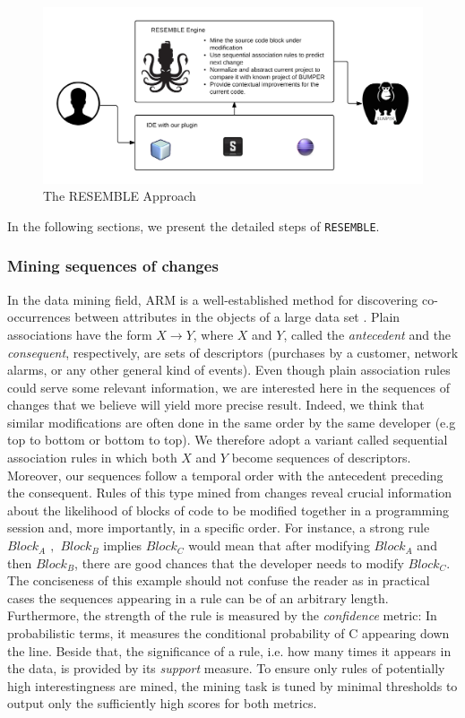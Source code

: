 \begin{figure}[h!]
    \includegraphics[scale=0.9]{media/resemble-approach.png}
    \caption{The RESEMBLE Approach
    \label{fig:RESEMBLE-approach}}
\end{figure}

In the following sections, we present the detailed steps of {\tt RESEMBLE}.

\subsubsection{Mining sequences of changes}

In the data mining field, ARM is a
well-established method for discovering co-occurrences between attributes
in the objects of a large data set \cite{Gregory1991,HEIKKI1997}. Plain
associations have the form $X \rightarrow Y$, where $X$ and $Y$,
called the \textit{antecedent} and the \textit{consequent}, respectively, are sets of descriptors
(purchases by a customer, network alarms, or any other general kind of events).
Even though plain association rules could serve some relevant information, we are interested here in
the sequences of changes that we believe will yield more precise result. Indeed, we think that similar modifications are often done in the same order by the same developer (e.g top to bottom or bottom to top).
We therefore adopt a variant called sequential association rules in which
both $X$ and $Y$ become sequences of descriptors.
Moreover, our sequences follow a temporal order with the antecedent preceding the consequent. 
Rules of this type mined from changes reveal crucial
information about the likelihood of blocks of code to be modified  together in a programming session
and, more importantly, in a specific order. 
For instance, a strong rule \emph{$Block_A$ $,$ $Block_B$} implies \emph{$Block_C$} would mean that after modifying $Block_A$ and then $Block_B$, there are good chances that the developer needs to modify $Block_C$.
The conciseness of this example should not confuse the reader as in practical cases
the sequences appearing in a rule can be of an arbitrary length.
Furthermore, the strength of the rule is measured by the \textit{confidence} metric: In probabilistic terms,
it measures the conditional probability of C appearing down the line.
Beside that, the significance of a rule, i.e. how many times it appears in the data,
is provided by its \textit{support} measure.
To ensure only rules of potentially high interestingness are mined,
the mining task is tuned by minimal thresholds to
output only the sufficiently high scores for both metrics.

